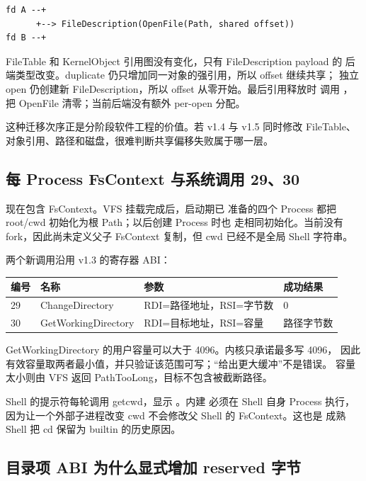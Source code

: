 \begin{lstlisting}
fd A --+
      +--> FileDescription(OpenFile(Path, shared offset))
fd B --+
\end{lstlisting}

FileTable 和 KernelObject 引用图没有变化，只有 FileDescription payload 的
后端类型改变。duplicate 仍只增加同一对象的强引用，所以 offset 继续共享；
独立 open 仍创建新 FileDescription，所以 offset 从零开始。最后引用释放时
调用 ，把 OpenFile 清零；当前后端没有额外 per-open 分配。

这种迁移次序正是分阶段软件工程的价值。若 v1.4 与 v1.5 同时修改 FileTable、
对象引用、路径和磁盘，很难判断共享偏移失败属于哪一层。

\subsection{每 Process FsContext 与系统调用 29、30}

 现在包含 FsContext。VFS 挂载完成后，启动期已
准备的四个 Process 都把 root/cwd 初始化为根 Path；以后创建 Process 时也
走相同初始化。当前没有 fork，因此尚未定义父子 FsContext 复制，但 cwd
已经不是全局 Shell 字符串。

两个新调用沿用 v1.3 的寄存器 ABI：

\begin{longtable}{L{0.10\textwidth}L{0.29\textwidth}L{0.37\textwidth}L{0.12\textwidth}}
\toprule
编号 & 名称 & 参数 & 成功结果\\
 & ChangeDirectory & RDI=路径地址，RSI=字节数 & 0\\
30 & GetWorkingDirectory & RDI=目标地址，RSI=容量 & 路径字节数\\
\bottomrule
\end{longtable}

GetWorkingDirectory 的用户容量可以大于 4096。内核只承诺最多写 4096，
因此有效容量取两者最小值，并只验证该范围可写；“给出更大缓冲”不是错误。
容量太小则由 VFS 返回 PathTooLong，目标不包含被截断路径。

Shell 的提示符每轮调用 getcwd，显示
。内建  必须在 Shell 自身 Process
执行，因为让一个外部子进程改变 cwd 不会修改父 Shell 的 FsContext。这也是
成熟 Shell 把 cd 保留为 builtin 的历史原因。

\subsection{目录项 ABI 为什么显式增加 reserved 字节}

